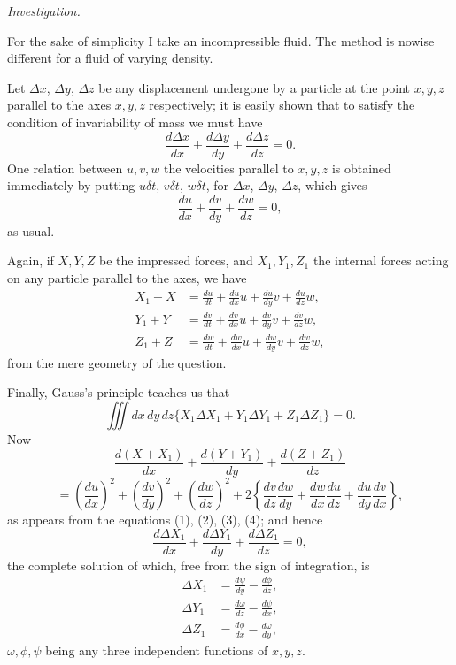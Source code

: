 \documentclass[11pt]{article}
\newcommand{\sourcepage}[1]{\marginpar{\scriptsize p.~#1}}
\newcommand{\tagtext}[1]{\tag{#1}}
\begin{document}
\begin{center}\itshape Investigation.\end{center}

For the sake of simplicity I take an incompressible fluid. The method is nowise different for a fluid of varying density.

Let $\Delta x$, $\Delta y$, $\Delta z$ be any displacement undergone by a particle at the point $x,y,z$ parallel to the axes $x,y,z$ respectively; it is easily shown that to satisfy the condition of invariability of mass we must have
\begin{equation}
\frac{d\Delta x}{dx}+\frac{d\Delta y}{dy}+\frac{d\Delta z}{dz}=0. \tagtext{$\alpha$}
\end{equation}
One relation between $u,v,w$ the velocities parallel to $x,y,z$ is obtained immediately by putting $u\delta t$, $v\delta t$, $w\delta t$, for $\Delta x$, $\Delta y$, $\Delta z$, which gives
\begin{equation}
\frac{du}{dx}+\frac{dv}{dy}+\frac{dw}{dz}=0, \tag{1}
\end{equation}
as usual.

Again, if $X,Y,Z$ be the impressed forces, and $X_1,Y_1,Z_1$ the internal forces acting on any particle parallel to the axes, we have
\begin{align}
X_1+X&=\frac{du}{dt}+\frac{du}{dx}u+\frac{du}{dy}v+\frac{du}{dz}w, \tag{2}\\
Y_1+Y&=\frac{dv}{dt}+\frac{dv}{dx}u+\frac{dv}{dy}v+\frac{dv}{dz}w, \tag{3}\\
Z_1+Z&=\frac{dw}{dt}+\frac{dw}{dx}u+\frac{dw}{dy}v+\frac{dw}{dz}w, \tag{4}
\end{align}
from the mere geometry of the question.

\sourcepage{30}
Finally, Gauss's principle teaches us that
\begin{equation}
\iiint dx\,dy\,dz\{X_1\Delta X_1+Y_1\Delta Y_1+Z_1\Delta Z_1\}=0. \tagtext{$\beta$}
\end{equation}
Now
\[
\frac{d(X+X_1)}{dx}+\frac{d(Y+Y_1)}{dy}+\frac{d(Z+Z_1)}{dz}
\]
\[
=\left(\frac{du}{dx}\right)^2+\left(\frac{dv}{dy}\right)^2+\left(\frac{dw}{dz}\right)^2
+2\left\{\frac{dv}{dz}\frac{dw}{dy}+\frac{dw}{dx}\frac{du}{dz}+\frac{du}{dy}\frac{dv}{dx}\right\},
\]
as appears from the equations (1), (2), (3), (4); and hence
\[
\frac{d\Delta X_1}{dx}+\frac{d\Delta Y_1}{dy}+\frac{d\Delta Z_1}{dz}=0,
\]
the complete solution of which, free from the sign of integration, is
\begin{align*}
\Delta X_1&=\frac{d\psi}{dy}-\frac{d\phi}{dz},\\
\Delta Y_1&=\frac{d\omega}{dz}-\frac{d\psi}{dx},\\
\Delta Z_1&=\frac{d\phi}{dx}-\frac{d\omega}{dy},
\end{align*}
$\omega,\phi,\psi$ being any three independent functions of $x,y,z$.
\end{document}
